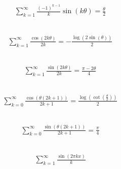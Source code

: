 \documentclass[12pt]{article}
\begin{document}
\subsection{}
\begin{align*}
\sum_{k=1}^{\infty} \frac{\left(-1\right)^{k - 1}}{k} \sin{\left(k \theta \right)} = \frac{\theta}{2}
\end{align*}
\vspace{1cm}
\subsection{}
\begin{align*}
\sum_{k=1}^{\infty} \frac{\cos{\left(2 k \theta \right)}}{2 k} = - \frac{\log{\left(2 \sin{\left(\theta \right)} \right)}}{2}
\end{align*}
\vspace{1cm}
\subsection{}
\begin{align*}
\sum_{k=1}^{\infty} \frac{\sin{\left(2 k \theta \right)}}{2 k} = \frac{\pi - 2 \theta}{4}
\end{align*}
\vspace{1cm}
\subsection{}
\begin{align*}
\sum_{k=0}^{\infty} \frac{\cos{\left(\theta \left(2 k + 1\right) \right)}}{2 k + 1} = \frac{\log{\left(\cot{\left(\frac{\theta}{2} \right)} \right)}}{2}
\end{align*}
\vspace{1cm}
\subsection{}
\begin{align*}
\sum_{k=0}^{\infty} \frac{\sin{\left(\theta \left(2 k + 1\right) \right)}}{2 k + 1} = \frac{\pi}{4}
\end{align*}
\vspace{1cm}
\subsection{}
\begin{align*}
\sum_{k=1}^{\infty} \frac{\sin{\left(2 \pi k x \right)}}{k}
\end{align*}
\vspace{1cm}
\end{document}
